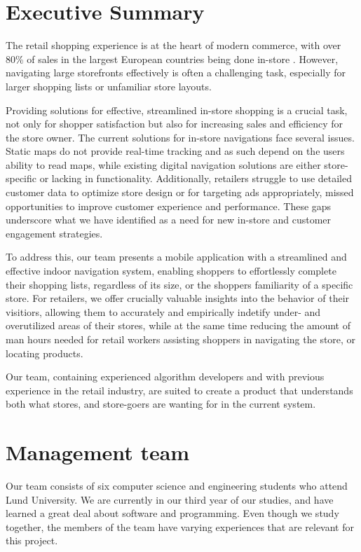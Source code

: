 \documentclass[titlepage]{article}
\begin{document}
\section{Executive Summary}

The retail shopping experience is at the heart of modern commerce, with over 80\% of sales in the largest European countries being done in-store \cite{statista1}.
However, navigating large storefronts effectively is often a challenging task, especially for larger shopping lists or unfamiliar store layouts.

Providing solutions for effective, streamlined in-store shopping is a crucial task, not only for shopper satisfaction but also for increasing sales and efficiency for the store owner.
The current solutions for in-store navigations face several issues. Static maps do not provide real-time tracking and as such depend on the users ability to read maps, while existing digital navigation solutions are either store-specific or lacking in functionality.
Additionally, retailers struggle to use detailed customer data to optimize store design or for targeting ads appropriately, missed opportunities to improve customer experience and performance. These gaps underscore what we have identified as a need for new in-store and customer engagement strategies.

To address this, our team presents a mobile application with a streamlined and effective indoor navigation system, enabling shoppers to effortlessly complete their shopping lists, regardless of its size, or the shoppers familiarity of a specific store.
For retailers, we offer crucially valuable insights into the behavior of their visitiors, allowing them to accurately and empirically indetify under- and overutilized areas of their stores, 
while at the same time reducing the amount of man hours needed for retail workers assisting shoppers in navigating the store, or locating products.

Our team, containing experienced algorithm developers and with previous experience in the retail industry, are suited to create a product that understands both what stores, and store-goers are wanting for in the current system.

\section{Management team}

Our team consists of six computer science and engineering students who attend Lund University. We are currently in our third year of our studies, and have learned a great deal about software and programming. Even though we study together, the members of the team have varying experiences that are relevant for this project.
\end{document}
